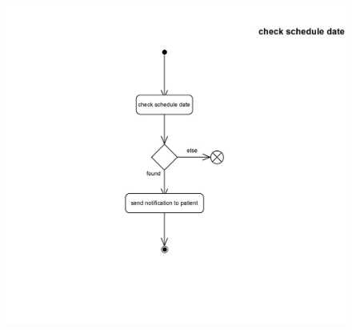 \documentclass[]{article}
\begin{document}
\begin{figure}[H]
\centering
\includegraphics[scale=0.6]{./activity/26}
\end{figure}
\end{document}
